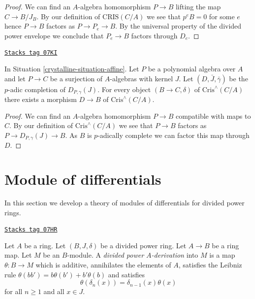 \begin{proof}
We can find an $A$-algebra homomorphism $P \to B$
lifting the map $C \to B/J_B$. By our definition of
$\text{CRIS}(C/A)$ we see that $p^eB = 0$ for
some $e$ hence $P \to B$ factors as $P \to P_e \to B$.
By the universal property of the divided power envelope we
conclude that $P_e \to B$ factors through $D_e$.
\end{proof}

\begin{lemma}
\label{crystalline-lemma-generator-completion}
\href{https://stacks.math.columbia.edu/tag/07KI}{\texttt{Stacks tag 07KI}}

In Situation \ref{crystalline-situation-affine}.
Let $P$ be a polynomial algebra over $A$ and let
$P \to C$ be a surjection of $A$-algebras with kernel $J$.
Let $(D, \bar J, \bar\gamma)$ be the $p$-adic completion of
$D_{P, \gamma}(J)$. For every object $(B \to C, \delta)$ of
$\text{Cris}^\wedge(C/A)$ there
exists a morphism $D \to B$ of $\text{Cris}^\wedge(C/A)$.
\end{lemma}

\begin{proof}
We can find an $A$-algebra homomorphism $P \to B$ compatible
with maps to $C$. By our definition of
$\text{Cris}^\wedge(C/A)$ we see that $P \to B$ factors as
$P \to D_{P, \gamma}(J) \to B$. As $B$ is $p$-adically complete
we can factor this map through $D$.
\end{proof}

\section{Module of differentials}
\label{crystalline-section-differentials}
In this section we develop a theory of modules of differentials
for divided power rings.

\begin{definition}[Derivation]
\label{crystalline-definition-derivation}
\href{https://stacks.math.columbia.edu/tag/07HR}{\texttt{Stacks tag 07HR}}

Let $A$ be a ring. Let $(B, J, \delta)$ be a divided power ring.
Let $A \to B$ be a ring map. Let $M$ be an $B$-module.
A {\it divided power $A$-derivation} into $M$ is a map
$\theta : B \to M$ which is additive, annihilates the elements
of $A$, satisfies the Leibniz rule
$\theta(bb') = b\theta(b') + b'\theta(b)$ and satisfies
$$
\theta(\delta_n(x)) = \delta_{n - 1}(x)\theta(x)
$$
for all $n \geq 1$ and all $x \in J$.
\end{definition}

